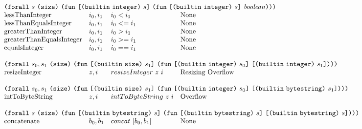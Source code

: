 \documentclass[../main.tex]{subfiles}
\begin{document}
\begin{figure*}[t]
\[\begin{array}{llll}
        \multicolumn{4}{l}{
          \forallT{s}{\sizeK{}}{
            \funT{\appT{\builtinT{\builtinIntegerType{}}}{s}}
                 {\funT{\appT{\builtinT{\builtinIntegerType{}}}{s}}
                       {\mathit{boolean}}}}}\\
        \mathrm{lessThanInteger}            &  i_0 , i_1   &   i_0 < i_1    &   \textrm{None}         \\
        \mathrm{lessThanEqualsInteger}      &  i_0 , i_1   &   i_0 <= i_1   &   \textrm{None}         \\
        \mathrm{greaterThanInteger}         &  i_0 , i_1   &   i_0 > i_1    &   \textrm{None}         \\
        \mathrm{greaterThanEqualsInteger}   &  i_0 , i_1   &   i_0 >= i_1   &   \textrm{None}         \\
        \mathrm{equalsInteger}              &  i_0 , i_1   &   i_0 == i_1   &   \textrm{None}         \\
        &&\\
        
        \multicolumn{4}{l}{
          \forallT{s_0,s_1}{\sizeK{}}{
            \funT{\appT{\builtinT{\builtinSizeType{}}}{s_1}}
                 {\funT{\appT{\builtinT{\builtinIntegerType{}}}{s_0}}
                       {\appT{\builtinT{\builtinIntegerType{}}}{s_1}}}}} \\
        \mathrm{resizeInteger}   &   z, i   &   resizeInteger ~ z ~ i   &   \textrm{Resizing Overflow} \\
        &&\\
        
        \multicolumn{4}{l}{
          \forallT{s_0,s_1}{\sizeK{}}{
            \funT{\appT{\builtinT{\builtinSizeType{}}}{s_1}}
                 {\funT{\appT{\builtinT{\builtinIntegerType{}}}{s_0}}
                       {\appT{\builtinT{\builtinBytestringType{}}}{s_1}}}}}\\
        \mathrm{intToByteString}            &  z, i           &   intToByteString ~ z ~ i   &   \textrm{Overflow} \\
        &&\\
        
        
        \multicolumn{4}{l}{
          \forallT{s}{\sizeK{}}{
            \funT{\appT{\builtinT{\builtinBytestringType{}}}{s}}
                 {\funT{\appT{\builtinT{\builtinBytestringType{}}}{s}}
                       {\appT{\builtinT{\builtinBytestringType{}}}{s}}}}}\\
        \mathrm{concatenate}       &   b_0 , b_1   & concat ~ [b_0,b_1]   &   \textrm{None}         \\
        &&\\
        

\end{array}\]
\end{figure*}
\end{document}
